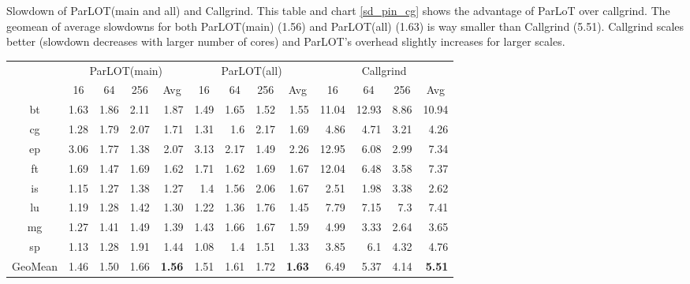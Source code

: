 
\caption{Slowdown of ParLOT(main and all) and Callgrind. This table and chart \ref{sd_pin_cg} shows the advantage of ParLoT over callgrind. The geomean of average slowdowns for both ParLOT(main) (1.56) and ParLOT(all) (1.63) is way smaller than Callgrind (5.51). Callgrind scales better (slowdown decreases with larger number of cores) and ParLOT's overhead slightly increases for larger scales.}

\begin{tabular}{c|rrrr|rrrr|rrrr|}
\cline{2-13}
\multicolumn{1}{l|}{} & \multicolumn{4}{c|}{ParLOT(main)} & \multicolumn{4}{c|}{ParLOT(all)} & \multicolumn{4}{c|}{Callgrind} \\ \cline{2-13} 
\multicolumn{1}{l|}{} & \multicolumn{1}{c}{16} & \multicolumn{1}{c}{64} & \multicolumn{1}{c}{256} & \multicolumn{1}{c|}{Avg} & \multicolumn{1}{c}{16} & \multicolumn{1}{c}{64} & \multicolumn{1}{c}{256} & \multicolumn{1}{c|}{Avg} & \multicolumn{1}{c}{16} & \multicolumn{1}{c}{64} & \multicolumn{1}{c}{256} & \multicolumn{1}{c|}{Avg} \\ \hline
\multicolumn{1}{|c|}{bt} & 1.63 & 1.86 & 2.11 & 1.87 & 1.49 & 1.65 & 1.52 & 1.55 & 11.04 & 12.93 & 8.86 & 10.94 \\
\multicolumn{1}{|c|}{cg} & 1.28 & 1.79 & 2.07 & 1.71 & 1.31 & 1.6 & 2.17 & 1.69 & 4.86 & 4.71 & 3.21 & 4.26 \\
\multicolumn{1}{|c|}{ep} & 3.06 & 1.77 & 1.38 & 2.07 & 3.13 & 2.17 & 1.49 & 2.26 & 12.95 & 6.08 & 2.99 & 7.34 \\
\multicolumn{1}{|c|}{ft} & 1.69 & 1.47 & 1.69 & 1.62 & 1.71 & 1.62 & 1.69 & 1.67 & 12.04 & 6.48 & 3.58 & 7.37 \\
\multicolumn{1}{|c|}{is} & 1.15 & 1.27 & 1.38 & 1.27 & 1.4 & 1.56 & 2.06 & 1.67 & 2.51 & 1.98 & 3.38 & 2.62 \\
\multicolumn{1}{|c|}{lu} & 1.19 & 1.28 & 1.42 & 1.30 & 1.22 & 1.36 & 1.76 & 1.45 & 7.79 & 7.15 & 7.3 & 7.41 \\
\multicolumn{1}{|c|}{mg} & 1.27 & 1.41 & 1.49 & 1.39 & 1.43 & 1.66 & 1.67 & 1.59 & 4.99 & 3.33 & 2.64 & 3.65 \\
\multicolumn{1}{|c|}{sp} & 1.13 & 1.28 & 1.91 & 1.44 & 1.08 & 1.4 & 1.51 & 1.33 & 3.85 & 6.1 & 4.32 & 4.76 \\ \hline
\multicolumn{1}{|c|}{GeoMean} & 1.46 & 1.50 & 1.66 & \textbf{1.56} & 1.51 & 1.61 & 1.72 & \textbf{1.63} & 6.49 & 5.37 & 4.14 & \textbf{5.51} \\ \hline
\end{tabular}
